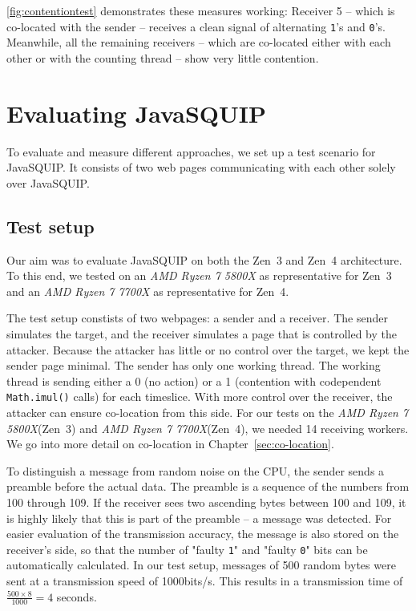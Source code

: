 \documentclass[11pt,
  titlepage=false,
]{scrreprt}
\begin{document}
\ref{fig:contentiontest} demonstrates these measures working:
Receiver 5 -- which is co-located with the sender -- receives a clean signal of alternating \texttt{1}'s and \texttt{0}'s.
Meanwhile, all the remaining receivers -- which are co-located either with each other or with the counting thread -- show very little contention.

\pagebreak
\chapter{Evaluating JavaSQUIP}
\label{ch:evaluation}

To evaluate and measure different approaches, we set up a test scenario for JavaSQUIP.
It consists of two web pages communicating with each other solely over JavaSQUIP.

\section {Test setup}
\label{sec:testsetup}
Our aim was to evaluate JavaSQUIP on both the Zen~3 and Zen~4 architecture.
To this end, we tested on an \textit{AMD Ryzen 7 5800X} as representative for Zen~3 and an \textit{AMD Ryzen 7 7700X} as representative for Zen~4.

The test setup constists of two webpages: a sender and a receiver.
The sender simulates the target, and the receiver simulates a page that is controlled by the attacker.
Because the attacker has little or no control over the target, we kept the sender page minimal.
The sender has only one working thread.
The working thread is sending either a 0 (no action) or a 1 (contention with codependent \texttt{Math.imul()} calls) for each timeslice.
With more control over the receiver, the attacker can ensure co-location from this side.
For our tests on the \textit{AMD Ryzen 7 5800X}(Zen~3) and \textit{AMD Ryzen 7 7700X}(Zen~4), we needed 14 receiving workers.
We go into more detail on co-location in Chapter~\ref{sec:co-location}.

To distinguish a message from random noise on the CPU, the sender sends a preamble before the actual data.
The preamble is a sequence of the numbers from 100 through 109.
If the receiver sees two ascending bytes between 100 and 109, it is highly likely that this is part of the preamble --
a message was detected.
For easier evaluation of the transmission accuracy, the message is also stored on the receiver's side,
so that the number of "faulty \texttt{1}" and "faulty \texttt{0}" bits can be automatically calculated.
In our test setup, messages of 500 random bytes were sent at a transmission speed of 1000bits/s.
This results in a transmission time of $\frac{500 \times 8}{1000} = 4$ seconds.
\end{document}

